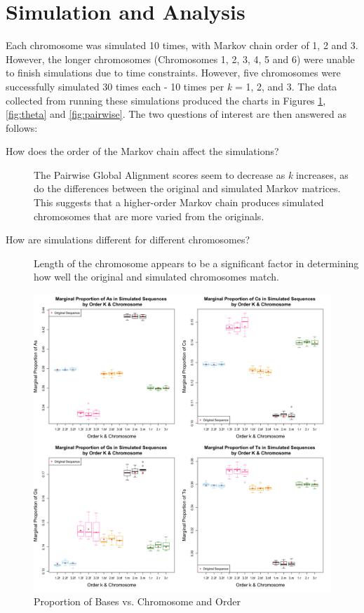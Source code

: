 \documentclass[12pt]{article}
\begin{document}
\section{Simulation and Analysis}
Each chromosome was simulated 10 times, with Markov chain order of 1, 2 and 3. However, the longer chromosomes (Chromosomes 1, 2, 3, 4, 5 and 6) were unable to finish simulations due to time constraints. However, five chromosomes were successfully simulated 30 times each - 10 times per \textit{k} = 1, 2, and 3. The data collected from running these simulations produced the charts in Figures \ref{fig:basewise}, \ref{fig:theta} and \ref{fig:pairwise}. The two questions of interest are then answered as follows:
\begin{description}
\item[How does the order of the Markov chain affect the simulations?] The Pairwise Global Alignment scores seem to decrease as \textit{k} increases, as do the differences between the original and simulated Markov matrices. This suggests that a higher-order Markov chain produces simulated chromosomes that are more varied from the originals.
\item[How are simulations different for different chromosomes?] Length of the chromosome appears to be a significant factor in determining how well the original and simulated chromosomes match.
\end{description}
\begin{figure}
  \centering
  \includegraphics[scale=0.2]{basewise.png}
  \caption{Proportion of Bases vs. Chromosome and Order\label{fig:basewise}}
\end{figure}
\end{document}
